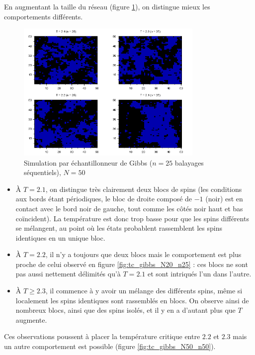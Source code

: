 \documentclass[a4paper,11pt]{article}
\begin{document}
En augmentant la taille du réseau (figure \ref{fig:tc_gibbs_N50_n25}), on distingue mieux les comportements différents.
\begin{figure}[!htbp]
	\centering
	\includegraphics[width=0.8\textwidth]{temperature_critique_gibbs_N50_n25.png}
	\caption{Simulation par échantillonneur de Gibbs ($n = 25$ balayages séquentiels), $N = 50$}
	\label{fig:tc_gibbs_N50_n25}
\end{figure}
\begin{itemize}
	\item À $T = 2.1$, on distingue très clairement deux blocs de spins (les conditions aux bords étant périodiques, le bloc de droite composé de $-1$ (noir) est en contact avec le bord noir de gauche, tout comme les côtés noir haut et bas coïncident). La température est donc trop basse pour que les spins différents se mélangent, au point où les états probablent rassemblent les spins identiques en un unique bloc.
	\item À $T = 2.2$, il n'y a toujours que deux blocs mais le comportement est plus proche de celui observé en figure \ref{fig:tc_gibbs_N20_n25} : ces blocs ne sont pas aussi nettement délimités qu'à $T = 2.1$ et sont intriqués l'un dans l'autre.
	\item À $T \geq 2.3$, il commence à y avoir un mélange des différents spins, même si localement les spins identiques sont rassemblés en blocs. On observe ainsi de nombreux blocs, ainsi que des spins isolés, et il y en a d'autant plus que $T$ augmente.
\end{itemize}
Ces observations poussent à placer la température critique entre $2.2$ et $2.3$ mais un autre comportement est possible (figure \ref{fig:tc_gibbs_N50_n50}).
\end{document}
